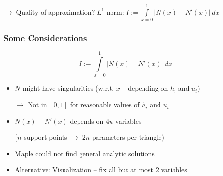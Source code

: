 \documentclass{beamer}
\newcommand{\todo}[1]{
  \textcolor{red}{TODO: #1}
  \note{\textcolor{red}{TODO: #1}}
}
\renewcommand{\todo}[1]{}
\begin{document}
\begin{frame}
\begin{columns}
\begin{column}{.4\textwidth}
\begin{center}
      \end{center}
    \end{column}
  \end{columns}

  \begin{center}
    $\rightarrow$ Quality of approximation? $L^1$ norm: $I := \int\limits_{x=0}^1 | N(x) - N'(x) |\ dx$ \todo{Hier wollte der Martin $L^1$-Norm drinstehen haben. Zu wenig Platz}
  \end{center}
\end{frame}

\begin{frame}
  \frametitle{Some Considerations}
  \begin{equation*}
    I := \int\limits_{x=0}^1 | N(x) - N'(x) |\ dx
  \end{equation*}
  \begin{itemize}
  \item $N$ might have singularities (w.r.t. $x$ -- depending on $h_i$ and $u_i$)

    $\rightarrow$ Not in $[0,1]$ for reasonable values of $h_i$ and $u_i$
  \item $N(x)-N'(x)$ depends on $4n$ variables

    ($n$ support points $\rightarrow$ $2n$ parameters per triangle)
  \item Maple could not find general analytic solutions \todo{Rausnehmen?}
  \item Alternative: Visualization -- fix all but at most 2 variables
  \end{itemize}
\end{frame}
\end{document}
